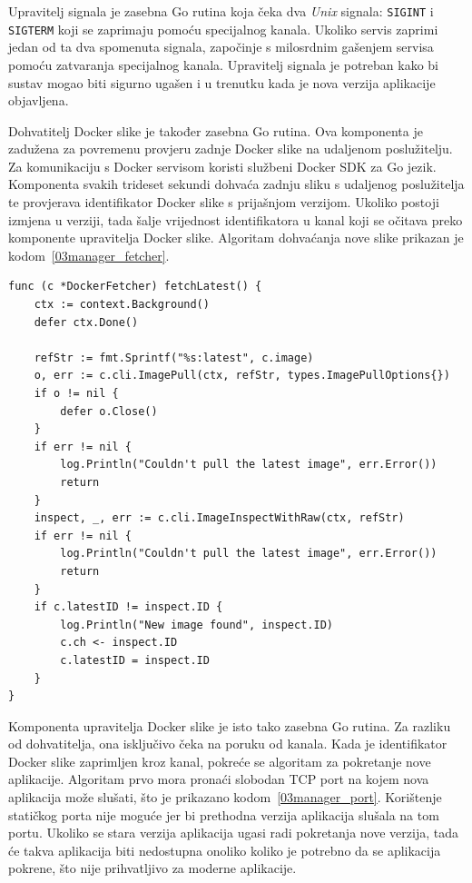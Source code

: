 Upravitelj signala je zasebna Go rutina koja čeka dva \textit{Unix} signala: \texttt{SIGINT} i
\texttt{SIGTERM} koji se zaprimaju pomoću specijalnog kanala. Ukoliko servis zaprimi jedan od ta dva
spomenuta signala, započinje s milosrdnim gašenjem servisa pomoću zatvaranja specijalnog kanala.
Upravitelj signala je potreban kako bi sustav mogao biti sigurno ugašen i u trenutku kada je nova
verzija aplikacije objavljena.

Dohvatitelj Docker slike je također zasebna Go rutina. Ova komponenta je zadužena za povremenu
provjeru zadnje Docker slike na udaljenom poslužitelju. Za komunikaciju s Docker servisom koristi
službeni Docker SDK za Go jezik. Komponenta svakih trideset sekundi dohvaća zadnju sliku s
udaljenog poslužitelja te provjerava identifikator Docker slike s prijašnjom verzijom. Ukoliko
postoji izmjena u verziji, tada šalje vrijednost identifikatora u kanal koji se očitava preko
komponente upravitelja Docker slike. Algoritam dohvaćanja nove slike prikazan je
kodom~\ref{03manager_fetcher}.

\begin{lstlisting}[float=h]
func (c *DockerFetcher) fetchLatest() {
	ctx := context.Background()
	defer ctx.Done()

	refStr := fmt.Sprintf("%s:latest", c.image)
	o, err := c.cli.ImagePull(ctx, refStr, types.ImagePullOptions{})
	if o != nil {
		defer o.Close()
	}
	if err != nil {
		log.Println("Couldn't pull the latest image", err.Error())
		return
	}
	inspect, _, err := c.cli.ImageInspectWithRaw(ctx, refStr)
	if err != nil {
		log.Println("Couldn't pull the latest image", err.Error())
		return
	}
	if c.latestID != inspect.ID {
		log.Println("New image found", inspect.ID)
		c.ch <- inspect.ID
		c.latestID = inspect.ID
	}
}
\end{lstlisting}

Komponenta upravitelja Docker slike je isto tako zasebna Go rutina. Za razliku od dohvatitelja, ona
isključivo čeka na poruku od kanala. Kada je identifikator Docker slike zaprimljen kroz kanal,
pokreće se algoritam za pokretanje nove aplikacije. Algoritam prvo mora pronaći slobodan TCP port na
kojem nova aplikacija može slušati, što je prikazano kodom~\ref{03manager_port}. Korištenje
statičkog porta nije moguće jer bi prethodna verzija aplikacija slušala na tom portu. Ukoliko se
stara verzija aplikacija ugasi radi pokretanja nove verzija, tada će takva aplikacija biti nedostupna
onoliko koliko je potrebno da se aplikacija pokrene, što nije prihvatljivo za moderne aplikacije.

